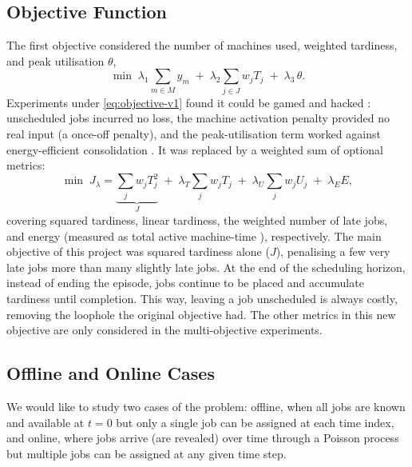 \documentclass[12pt]{article}
\begin{document}
\subsection{Objective Function}\label{sec:objectives}
The first objective considered the number of machines used, weighted tardiness, and peak utilisation $\theta$,
\begin{equation}\label{eq:objective-v1}
    \min \; \lambda_1 \sum_{m \in M} y_m \;+\; \lambda_2 \sum_{j \in J} w_j T_j \;+\; \lambda_3\, \theta.
\end{equation}
Experiments under \cref{eq:objective-v1} found it could be gamed and hacked \cite{skalse2022rewardhacking}: unscheduled jobs incurred no loss, the machine activation penalty provided no real input (a once-off penalty), and the peak-utilisation term worked against energy-efficient consolidation \cite{energyaware2012, fan2007powerprovisioning}. It was replaced by a weighted sum of optional metrics:
\begin{equation}\label{eq:objective-v2}
    \min \; J_{\lambda} = \underbrace{\sum_{j} w_j T_j^{2}}_{J}
          \;+\; \lambda_T \sum_{j} w_j T_j
          \;+\; \lambda_U \sum_{j} w_j U_j
          \;+\; \lambda_E E,
\end{equation}
covering squared tardiness, linear tardiness, the weighted number of late jobs, and energy (measured as total active machine-time \cite{fan2007powerprovisioning}), respectively. The main objective of this project was squared tardiness alone ($J$), penalising a few very late jobs more than many slightly late jobs. At the end of the scheduling horizon, instead of ending the episode, jobs continue to be placed and accumulate tardiness until completion. This way, leaving a job unscheduled is always costly, removing the loophole the original objective had. The other metrics in this new objective are only considered in the multi-objective experiments.

\subsection{Offline and Online Cases}\label{sec:cases}
We would like to study two cases of the problem: offline, when all jobs are known and available at $t = 0$ but only a single job can be assigned at each time index, and online, where jobs arrive (are revealed) over time through a Poisson process \cite{kleinrock1975queueing, mao2016deeprm} but multiple jobs can be assigned at any given time step.
\end{document}
